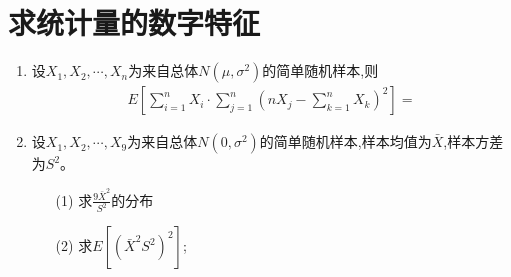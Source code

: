 \documentclass[12pt, a4paper, oneside, UTF8]{ctexbook}
\begin{document}
\section{求统计量的数字特征}

\begin{enumerate}[label=\arabic*.,start=3]
    \item 设$X_1,X_2,\cdots,X_n$为来自总体$N(\mu,\sigma^2)$的简单随机样本,则
    \begin{align*}
        E\left[\sum_{i=1}^{n}X_i\cdot\sum_{j=1}^{n}\left(nX_j-\sum_{k=1}^{n}X_k\right)^2\right]=
    \end{align*}
    
    \begin{solution}
    \newpage
    \end{solution}
    
    \item 设$X_1,X_2,\cdots,X_9$为来自总体$N(0,\sigma^2)$的简单随机样本,样本均值为$\bar{X}$,样本方差为$S^2$。
    \begin{enumerate}
        \item[(1)]求$\frac{9\bar{X}^2}{S^2}$的分布
        \item[(2)]求$E[(\bar{X}^2S^2)^2]$;
    \end{enumerate}
    
    \begin{solution}
    \newpage
    \end{solution}
\end{enumerate}
\ifx\allfiles\undefined
\end{document}
